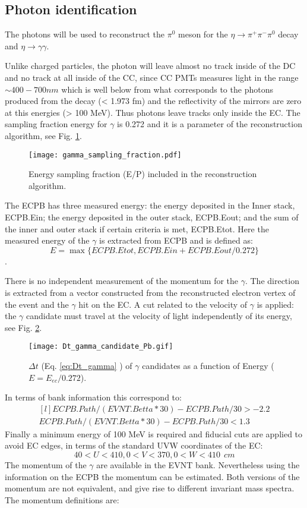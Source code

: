 \subsection{Photon identification}
The photons will be used to reconstruct the $\pi^0$ meson for the $\eta \rightarrow \pi^+\pi^-\pi^0$ decay and $\eta \rightarrow \gamma\gamma$.

Unlike charged particles, the photon will leave almost no track inside of the DC and no track at all inside of the CC, since CC PMTs measures light in the range $\sim 400 - 700 nm$ which is well below from what corresponds to the photons produced from the decay (< 1.973 fm) and the reflectivity of the mirrors are zero at this energies (> 100 MeV). Thus photons leave tracks only inside the EC.
The sampling fraction energy for $\gamma$ is 0.272 and it is a parameter of the reconstruction algorithm, see Fig. \ref{fig:gamma_sf}.
%
\begin{figure}[!ht]
\centering
\texttt{[image: gamma\_sampling\_fraction.pdf]}
\caption{Energy sampling fraction (E/P) included in the reconstruction algorithm.}
\label{fig:gamma_sf}
\end{figure}
%
\FloatBarrier
The ECPB has three measured energy: the energy deposited in the Inner stack, ECPB.Ein; the energy deposited in the outer stack, ECPB.Eout; and the sum of the inner and outer stack if  certain criteria is met,  ECPB.Etot. Here the measured energy of the $\gamma$ is extracted from ECPB and is defined as: $$E = \max \{ECPB.Etot,ECPB.Ein+ECPB.Eout/0.272\}$$.

There is no independent measurement of the momentum for the $\gamma$. The direction is extracted from a vector constructed from the reconstructed electron vertex of the event and the $\gamma$ hit on the EC.
A cut related to the velocity of $\gamma$ is applied: the $\gamma$ candidate must travel at the velocity of light independently of its energy, see Fig. \ref{fig:gamma_v_E}.
%
\begin{figure}[!ht]
\centering
\texttt{[image: Dt\_gamma\_candidate\_Pb.gif]}
\caption{$\Delta t$ (Eq. \eqref{eq:Dt_gamma} ) of $\gamma$ candidates as a function of Energy ($E = E_{ec}/0.272$).}
\label{fig:gamma_v_E}
\end{figure}
%
\FloatBarrier
In terms of bank information this correspond to:
\begin{equation}
\begin{matrix*}[l]
ECPB.Path/(EVNT.Betta*30) - ECPB.Path/30>-2.2\\
ECPB.Path/(EVNT.Betta*30) - ECPB.Path/30<1.3
\end{matrix*}
\label{eq:Dt_gamma}
\end{equation}
%              
Finally a minimum energy of 100 MeV is required and fiducial cuts are applied to avoid EC edges, in terms of the standard UVW coordinates of the EC: 
\begin{equation}
40<U<410,0<V<370,0<W<410~~cm
\end{equation}
%
The momentum of the $\gamma$ are available in the EVNT bank. Nevertheless using the information on the ECPB the momentum can be estimated. Both versions of the momentum are not equivalent, and give rise to different invariant mass spectra.
The momentum definitions are:


